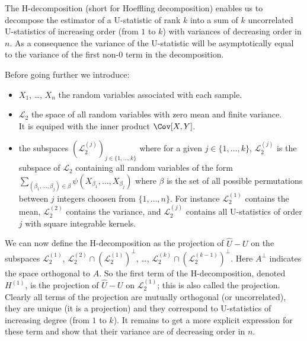 \documentclass[12pt]{article}
\begin{document}
The H-decomposition (short for Hoeffling decomposition) enables us to
decompose the estimator of a U-statistic of rank \(k\) into a sum of
\(k\) uncorrelated U-statistics of increasing order (from \(1\) to
\(k\)) with variances of decreasing order in \(n\). As a consequence
the variance of the U-statistic will be asymptotically equal to the
variance of the first non-0 term in the decomposition.

\bigskip

Before going further we introduce:
\begin{itemize}
\item \(X_1\), \ldots, \(X_n\) the random variables associated with each
sample.
\item \(\mathcal{L}_2\) the space of all random variables with zero mean
and finite variance. \\ It is equiped with the inner
product \(\Cov[X,Y]\).
\item the subspaces \(\left(\mathcal{L}_2^{(j)}\right)_{j \in
  \{1,\ldots,k\}}\) where for a given \(j\in \{1,\ldots,k\}\),
\(\mathcal{L}_2^{(j)}\) is the subspace of \(\mathcal{L}_2\)
containing all random variables of the form
\(\sum_{(\beta_1,\ldots,\beta_j) \in \beta}
  \psi(X_{\beta_1},\ldots,X_{\beta_j})\) where \(\beta\) is the set of
all possible permutations between \(j\) integers choosen from
\(\{1,\ldots,n\}\). For instance \(\mathcal{L}_2^{(1)}\) contains
the mean, \(\mathcal{L}_2^{(2)}\) contains the variance, and
\(\mathcal{L}_2^{(j)}\) contains all U-statistics of order \(j\)
with square integrable kernels.
\end{itemize}

We can now define the H-decomposition as the projection of
\(\hat{U}-U\) on the subspaces \(\mathcal{L}_2^{(1)}\),
\(\mathcal{L}_2^{(2)} \cap \left( \mathcal{L}_2^{(1)} \right)^{\perp}\), \ldots, \(\mathcal{L}_2^{(k)} \cap \left( \mathcal{L}_2^{(k-1)}
\right)^{\perp}\). Here \(A^{\perp}\) indicates the space orthogonal
to \(A\). So the first term of the H-decomposition, denoted
\(H^{(1)}\), is the projection of \(\hat{U}-U\) on
\(\mathcal{L}_2^{(1)}\); this is also called the \Hajek
projection. Clearly all terms of the projection are mutually
orthogonal (or uncorrelated), they are unique (it is a projection) and
they correspond to U-statistics of increasing degree (from \(1\) to
\(k\)). It remains to get a more explicit expression for these term
and show that their variance are of decreasing order in \(n\).

\bigskip
\end{document}
